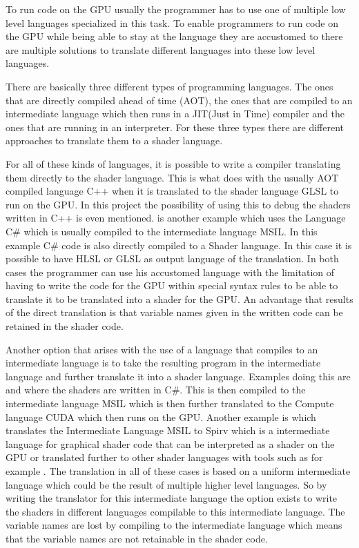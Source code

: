 To run code on the GPU usually the programmer has to use one of  multiple low level languages specialized in this task. To enable programmers to run code on the GPU while being able to stay at the language they are accustomed to there are multiple solutions to translate different languages into these low level languages.

There are basically three different types of programming languages. The ones that are directly compiled ahead of time (AOT), the ones that are compiled to an intermediate language which then runs in a JIT(Just in Time) compiler and the ones that are running in an interpreter. For these three types there are different approaches to translate them to a shader language.

For all of these kinds of languages, it is possible to write a compiler translating them directly to the shader language. This is what  does with the usually AOT compiled language C++ when it is translated to the shader language GLSL
to run on the GPU. In this project the possibility of using this to debug the shaders written in C++ is even mentioned.  is another example which uses the Language C\# which is usually compiled to the intermediate language MSIL. In this example C\# code is also directly compiled to a Shader language. In this case it is possible to have HLSL or GLSL as output language of the translation. In both cases the programmer can use his accustomed language with the limitation of having to write the code for the GPU within special syntax rules to be able to translate it to be translated into a shader for the GPU. An advantage that results of the direct translation is that variable names given in the written code can be retained in the shader code.

Another option that arises with the use of a language that compiles to an intermediate language is to take the resulting program in the intermediate language and further translate it into a shader language. Examples doing this are  and  where the shaders are written in C\#. This is then compiled to the intermediate language MSIL which is then further translated to the Compute language CUDA which then runs on the GPU. Another example is  which translates the Intermediate Language MSIL to Spirv which is a intermediate language for graphical shader code that can be interpreted as a shader on the GPU or translated further to other shader languages with tools such as for example . The translation in all of these cases is based on a uniform intermediate language which could be the result of multiple higher level languages. So by writing the translator for this intermediate language the option exists to write the shaders in different languages compilable to this intermediate language. The variable names are lost by compiling to the intermediate language which means that the variable names are not retainable in the shader code.

